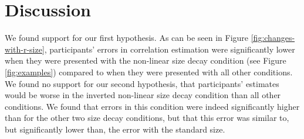 \documentclass{vgtc}                          %
\begin{document}
\hypertarget{discussion}{%
\section{Discussion}\label{discussion}}

We found support for our first hypothesis. As can be seen in Figure \ref{fig:changes-with-r-size},
participants' errors in correlation estimation were significantly lower when
they were presented with the non-linear size decay condition (see Figure \ref{fig:examples})
compared to when they were presented with all other conditions. We found no support
for our second hypothesis, that participants' estimates would be worse in the
inverted non-linear size decay condition than all other conditions. We found that
errors in this condition were indeed significantly higher than for the other
two size decay conditions, but that this error was similar to, but significantly lower than,
the error with the standard size.
\end{document}
